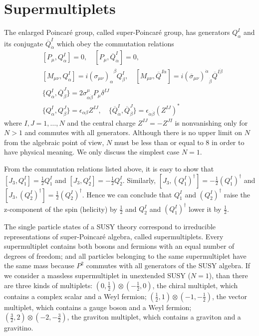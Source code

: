 \documentclass[12pt]{report}
\begin{document}
\section{Supermultiplets} \label{sec: supermultiplets}
The enlarged Poincar\'{e} group, called super-Poincar\'{e} group, has generators $Q^{I}_{\alpha}$ and its conjugate $\overline{Q}^{I}_{\dot{\alpha}}$ which obey the commutation relations
\begin{align}
& [P_{\mu}, Q^{I}_{\alpha}] = 0, \quad 
[P_{\mu}, \overline{Q}^{I}_{\dot{\alpha}}] = 0,\\
& [M_{\mu \nu}, Q^{I}_{\alpha}] = i {(\sigma_{\mu \nu})_{\alpha}}^{\beta} Q^{I}_{\beta}, \quad 
[M_{\mu \nu}, \overline{Q}^{I\dot{\alpha}}] = i {(\overline{\sigma}_{\mu \nu})^{\dot{\alpha}}}_{\dot{\beta}} \overline{Q}^{I \dot{\beta}}\\
& \{Q^{I}_{\alpha}, \overline{Q}^{J}_{\dot{\beta}}\} = 2 \sigma^{\mu}_{\alpha \dot{\beta}} P_{\mu} \delta^{IJ}\\
& \{Q^{I}_{\alpha}, Q^{J}_{\beta}\} = \epsilon_{\alpha \beta} Z^{IJ}, \quad 
\{\overline{Q}^{I}_{\dot{\alpha}}, \overline{Q}^{J}_{\dot{\beta}}\} = \epsilon_{\dot{\alpha} \dot{\beta}} (Z^{IJ})^{*}
\end{align}
where $I, J = 1, \dots, N$ and the central charge $Z^{IJ} = -Z^{JI}$ is nonvanishing only for $N > 1$ and commutes with all generators.
Although there is no upper limit on $N$ from the algebraic point of view, $N$ must be less than or equal to $8$ in order to have physical meaning.
We only discuss the simplest case $N = 1$. %

From the commutation relations listed above, it is easy to show that $[J_{3}, Q^{I}_{1}] = \frac{1}{2} Q^{I}_{1}$ and $[J_{3}, Q^{I}_{2}] = - \frac{1}{2} Q^{I}_{2}$.
Similarly, $[J_{3}, (Q^{I}_{1})^{\dag}] = -\frac{1}{2} (Q^{I}_{1})^{\dag}$ and $[J_{3}, (Q^{I}_{2})^{\dag}] = \frac{1}{2} (Q^{I}_{2})^{\dag}$.
Hence we can conclude that $Q^{I}_{1}$ and $(Q^{I}_{2})^{\dag}$ raise the z-component of the spin (helicity) by $\frac{1}{2}$ and $Q^{I}_{2}$ and $(Q^{I}_{1})^{\dag}$ lower it by $\frac{1}{2}$.

The single particle states of a SUSY theory correspond to irreducible representations of super-Poincar\'{e} algebra, called supermultiplets.
Every supermultiplet contains both bosons and fermions with an equal number of degrees of freedom; and all particles belonging to the same supermultiplet have the same mass because $P^{2}$ commutes with all generators of the SUSY algebra.
If we consider a massless supermultiplet in unextended SUSY ($N = 1$), than there are three kinds of multiplets:
$(0, \frac{1}{2}) \otimes (-\frac{1}{2}, 0)$, the chiral multiplet, which contains a complex scalar and a Weyl fermion;
$(\frac{1}{2}, 1) \otimes (-1, -\frac{1}{2})$, the vector multiplet, which contains a gauge boson and a Weyl fermion;
$(\frac{3}{2}, 2) \otimes (-2, -\frac{3}{2})$, the graviton multiplet, which contains a graviton and a gravitino.
\end{document}
